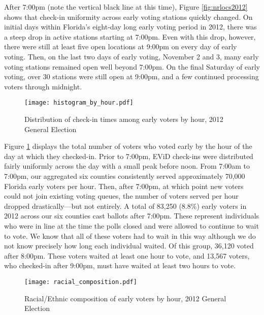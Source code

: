 \documentclass[12pt,titlepage]{article}
\begin{document}
After 7:00pm (note the vertical black line at this time), Figure
\ref{fig:nrlocs2012} shows that check-in uniformity across early
voting stations quickly changed.  On initial days within Florida's
eight-day long early voting period in 2012, there was a steep drop in
active stations starting at 7:00pm.  Even with this drop, however,
there were still at least five open locations at 9:00pm on every day
of early voting.  Then, on the last two days of early voting, November
2 and 3, many early voting stations remained open well beyond 7:00pm.
On the final Saturday of early voting, over 30 stations were still
open at 9:00pm, and a few continued processing voters through
midnight.

\begin{figure}[!ht]
\caption{Distribution of check-in times among early voters by hour, 2012 General Election}
  \label{fig:hist2012}
  \centering
    \centering\texttt{[image: histogram\_by\_hour.pdf]}
\end{figure}

Figure \ref{fig:hist2012} displays the total number of voters who
voted early by the hour of the day at which they checked-in. Prior to
7:00pm, EViD check-ins were distributed fairly uniformly across the
day with a small peak before noon.  From 7:00am to 7:00pm, our
aggregated six counties consistently served approximately 70,000
Florida early voters per hour. Then, after 7:00pm, at which point new
voters could not join existing voting queues, the number of voters
served per hour dropped drastically---but not entirely.  A total of
83,250 (8.8\%) early voters in 2012 across our six counties cast
ballots after 7:00pm. These represent individuals who were in line at
the time the polls closed and were allowed to continue to wait to
vote.  We know that all of these voters had to wait in this way
although we do not know precisely how long each individual waited.  Of
this group, 36,120 voted after 8:00pm.  These voters waited at least
one hour to vote, and 13,567 voters, who checked-in after 9:00pm, must
have waited at least two hours to vote.




\begin{figure}[!ht]
\caption{Racial/Ethnic composition of early voters by hour, 2012 General Election}
  \label{fig:race2012}
  \centering
    \centering\texttt{[image: racial\_composition.pdf]}
\end{figure}
\end{document}
